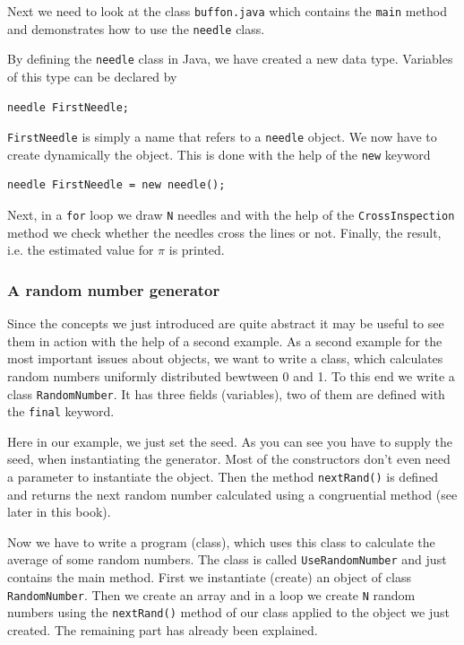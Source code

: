 Next we need to look at the class \verb|buffon.java| which contains the
\verb|main| method and demonstrates how to use the \verb|needle| class.


By defining the \verb|needle| class in Java, we have created a new
data type. Variables of this type can be declared by
\begin{verbatim}
needle FirstNeedle;
\end{verbatim}
\verb|FirstNeedle| is simply a name that refers to a \verb|needle|
object. We now have to create dynamically the object. This
is done with the help of the \verb|new| keyword
\begin{verbatim}
needle FirstNeedle = new needle();
\end{verbatim}
Next, in a \verb|for| loop we draw \verb|N|  needles and with the help
of the \verb|CrossInspection| method we check whether the needles
cross the lines or not. Finally, the result, i.e. the estimated value
for $\pi$ is printed.

\subsubsection{A random number generator}
Since the concepts we just introduced are quite abstract it may be
useful to see them in action with the help of a second example.
As a second example for the most important issues about objects, we
want to write a class, which calculates random numbers uniformly
distributed bewtween 0 and 1. To this end we write a class
\verb|RandomNumber|. It has three fields (variables), two of them are
defined with the \verb|final| keyword.


Here in our example, we just set the seed. As 
you can see you have to supply the seed, when instantiating the
generator. Most of the constructors don't even need a parameter to 
instantiate the object. 
Then the method \verb|nextRand()| is defined and returns the next
random number calculated using a congruential method (see later in this
book). 

Now we have to write a program (class), which uses this class to 
calculate the average of some random numbers.
The class is called \verb|UseRandomNumber| and just contains the
main method. First we instantiate (create) an object of class
\verb|RandomNumber|. Then we create an array and in a loop we
create \verb|N| random numbers using the \verb|nextRand()| method
of our class applied to the object we just created. The remaining
part has already been explained.

